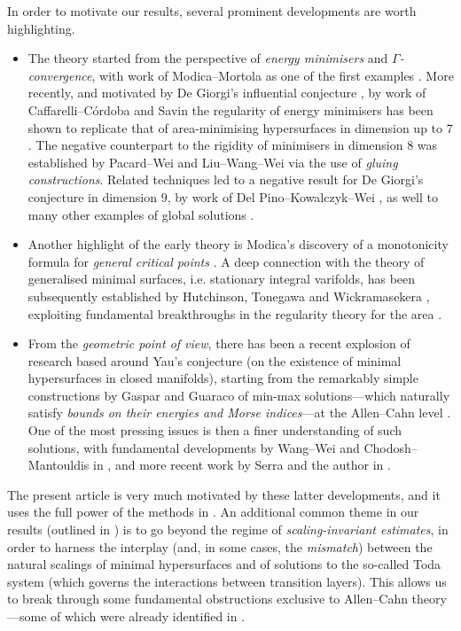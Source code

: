 \documentclass{article}
\theoremstyle{definition}
\begin{document}
In order to motivate our results, several prominent developments are worth highlighting.
\begin{itemize}
    \item The theory started from the perspective of \textit{energy minimisers} and \textit{$\Gamma$-convergence}, with work of Modica--Mortola as one of the first examples \cite{MM77}. More recently, and motivated by De Giorgi's influential conjecture \cite{DeG78}, by work of Caffarelli--C\'ordoba and Savin the regularity of energy minimisers has been shown to replicate that of area-minimising hypersurfaces in dimension up to $7$ \cite{CC95, CC06, Sav09}. The negative counterpart to the rigidity of minimisers in dimension $8$ was established by Pacard--Wei and Liu--Wang--Wei \cite{PW13,LWW17b} via the use of {\it gluing constructions}. Related techniques led to a negative result for De Giorgi's conjecture in dimension $9$, by work of Del Pino--Kowalczyk--Wei \cite{dPKW11}, as well to many other examples of global solutions \cite{dPKW13}.
    \item Another highlight of the early theory is Modica's discovery of a monotonicity formula for \textit{general critical points} \cite{Modica85,ModicaMonotonicity}. A deep connection with the theory of generalised minimal surfaces, i.e. stationary integral varifolds, has been subsequently established by Hutchinson, Tonegawa and Wickramasekera \cite{Hut86,HT00, Ton05, TonegawaWickramasekera2012}, exploiting fundamental breakthroughs in the regularity theory for the area \cite{Wic14}.
    \item From the \textit{geometric point of view}, there has been a recent explosion of research based around Yau's conjecture (on the existence of minimal hypersurfaces in closed manifolds), starting from the remarkably simple constructions by Gaspar and Guaraco of min-max solutions---which naturally satisfy \textit{bounds on their energies and Morse indices}---at the Allen--Cahn level \cite{Guaraco2018,GasparGuaraco2018,GGWeyl}. One of the most pressing issues is then a finer understanding of such solutions, with fundamental developments by Wang--Wei and Chodosh--Mantouldis in \cite{WW18, WW19, CM20}, and more recent work by Serra and the author in \cite{FSstable}.
\end{itemize}



The present article is very much motivated by these latter developments, and it uses the full power of the methods in \cite{WW18, WW19, CM20}. An additional common theme in our results (outlined in ) is to go beyond the regime of \textit{scaling-invariant estimates}, in order to harness the interplay (and, in some cases, the \textit{mismatch}) between the natural scalings of minimal hypersurfaces and of solutions to the so-called Toda system (which governs the interactions between transition layers). This allows us to break through some fundamental obstructions exclusive to Allen--Cahn theory---some of which were already identified in \cite{FSstable}.
\end{document}
